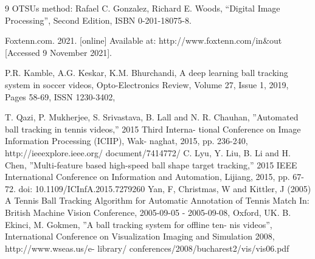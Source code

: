 \documentclass{article}
\begin{document}
\begin{thebibliography}{9}
OTSUs method: Rafael C. Gonzalez, Richard E. Woods, “Digital Image Processing”, Second Edition, ISBN 0-201-18075-8.

Foxtenn.com. 2021. [online] Available at: http://www.foxtenn.com/in\&out [Accessed 9 November 2021].

P.R. Kamble, A.G. Keskar, K.M. Bhurchandi,
A deep learning ball tracking system in soccer videos,
Opto-Electronics Review,
Volume 27, Issue 1,
2019,
Pages 58-69,
ISSN 1230-3402,



T. Qazi, P. Mukherjee, S. Srivastava, B. Lall and N. R. Chauhan, ”Automated ball tracking in tennis videos,” 2015 Third Interna- tional Conference on Image Information Processing (ICIIP), Wak- naghat, 2015, pp. 236-240, http://ieeexplore.ieee.org/ document/7414772/
C. Lyu, Y. Liu, B. Li and H. Chen, ”Multi-feature based high-speed ball shape target tracking,” 2015 IEEE International Conference on Information and Automation, Lijiang, 2015, pp. 67-72. doi: 10.1109/ICInfA.2015.7279260
Yan, F, Christmas, W and Kittler, J (2005) A Tennis Ball Tracking Algorithm for Automatic Annotation of Tennis Match In: British Machine Vision Conference, 2005-09-05 - 2005-09-08, Oxford, UK.
B. Ekinci, M. Gokmen, ”A ball tracking system for offline ten- nis videos”, International Conference on Visualization Imaging and Simulation 2008, http://www.wseas.us/e- library/ conferences/2008/bucharest2/vis/vis06.pdf


\end{thebibliography}
\end{document}
